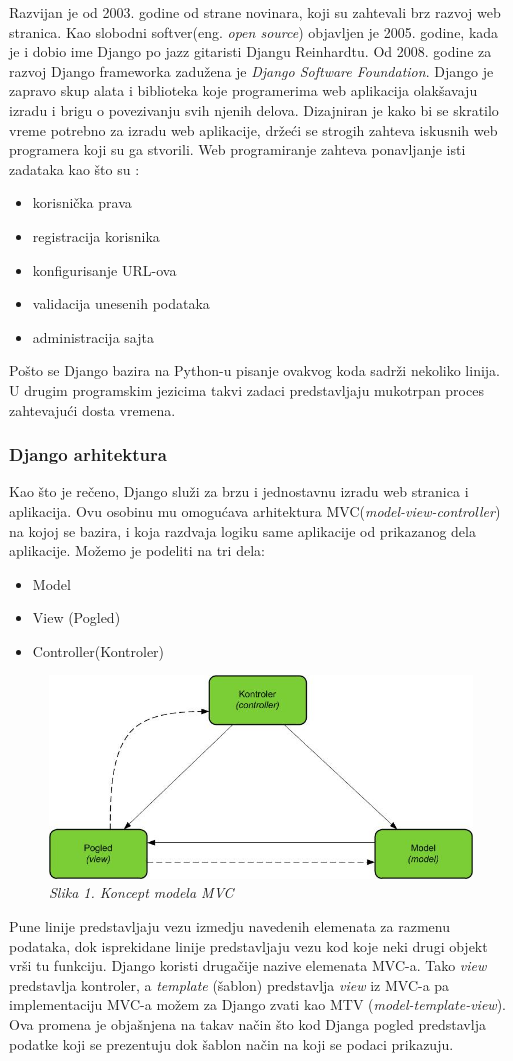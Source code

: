 \documentclass[12pt]{article}
\begin{document}
Razvijan je od 2003. godine od strane novinara, koji su zahtevali brz razvoj web stranica. Kao slobodni softver(eng. \textsl{open source}) objavljen je 2005. godine, kada je i dobio ime Django po jazz gitaristi Djangu Reinhardtu. Od 2008. godine za razvoj Django frameworka zadužena je \textsl{Django Software Foundation}.
Django je zapravo skup alata i biblioteka koje programerima web aplikacija olakšavaju 
izradu i brigu o povezivanju svih njenih delova. Dizajniran je kako bi se skratilo vreme potrebno za izradu web aplikacije, držeći se strogih zahteva iskusnih web programera koji su ga stvorili. Web programiranje zahteva ponavljanje isti zadataka kao što su :
\begin{itemize}
\item korisnička prava
\item registracija korisnika
\item konfigurisanje URL-ova
\item validacija unesenih podataka
\item administracija sajta
\end{itemize}
Pošto se Django bazira na Python-u pisanje ovakvog koda sadrži nekoliko linija. U drugim programskim jezicima takvi zadaci predstavljaju mukotrpan proces zahtevajući dosta vremena. 
\subsubsection{Django arhitektura}
Kao što je rečeno, Django služi za brzu i jednostavnu izradu web stranica i aplikacija.  Ovu osobinu mu omogućava arhitektura MVC(\textsl{model-view-controller}) na kojoj se bazira, i koja razdvaja logiku same aplikacije od prikazanog dela aplikacije. Možemo je podeliti na tri dela:
\begin{itemize}
\item Model 
\item View (Pogled)
\item Controller(Kontroler)
\end{itemize}
\begin{figure}[h!]
\centering
\includegraphics[width=0.6\linewidth]{django.jpeg}
\caption*{\textsl{Slika 1. Koncept modela MVC }}
\end{figure}
Pune linije predstavljaju vezu izmedju navedenih elemenata za razmenu podataka, dok isprekidane linije predstavljaju vezu kod koje neki drugi objekt vrši tu funkciju. Django koristi drugačije nazive elemenata MVC-a. Tako \textsl{view} predstavlja kontroler, a \textsl{template} (šablon) predstavlja \textsl{view} iz MVC-a pa implementaciju MVC-a možem za Django zvati kao MTV (\textsl{model-template-view}).  Ova promena je objašnjena na takav način što kod Djanga pogled predstavlja podatke koji se prezentuju dok šablon način na koji se podaci prikazuju. 
\end{document}
